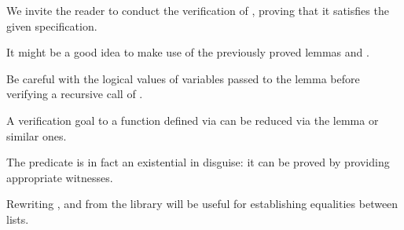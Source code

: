 \begin{exercise}
\noindent
We invite the reader to conduct the verification of , proving
that it satisfies the given specification.


\hint It might be a good idea to make use of the previously proved
 lemmas  and .


\hint Be careful with the logical values of variables passed to the
 lemma before verifying a recursive call of .


\hint A verification goal to a function defined via  can be
reduced via the  lemma or similar ones.


\hint The  predicate is in fact an existential in
disguise: it can be proved by providing appropriate witnesses.


\hint Rewriting ,  and  from the 
library will be useful for establishing equalities between lists.
\begin{coqdoccode}
\coqdocemptyline
\coqdocemptyline
\end{coqdoccode}
\end{exercise} \begin{coqdoccode}
\coqdocemptyline
\end{coqdoccode}
